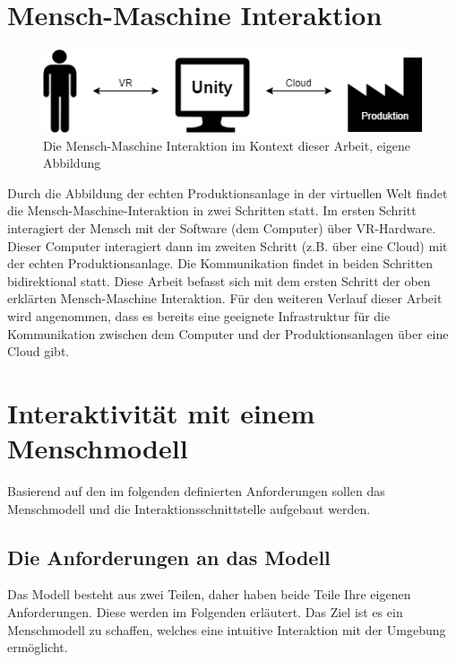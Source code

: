 \section{Mensch-Maschine Interaktion}\label{sec:MMInteraktion}
\begin{figure}[h]
	\centering
	\includegraphics[width=0.7\linewidth]{Bilder/A19_MMI}
	\caption{Die Mensch-Maschine Interaktion im Kontext dieser Arbeit, eigene Abbildung}
	\label{fig:MMI}
\end{figure}
\noindent Durch die Abbildung der echten Produktionsanlage in der virtuellen Welt findet die Mensch-Maschine-Interaktion in zwei Schritten statt. Im ersten Schritt interagiert der Mensch mit der Software (dem Computer) über VR-Hardware. Dieser Computer interagiert dann im zweiten Schritt (z.B. über eine Cloud) mit der echten Produktionsanlage. Die Kommunikation findet in beiden Schritten bidirektional statt.
\newline
Diese Arbeit befasst sich mit dem ersten Schritt der oben erklärten Mensch-Maschine Interaktion. Für den weiteren Verlauf dieser Arbeit wird angenommen, dass es bereits eine geeignete Infrastruktur für die Kommunikation zwischen dem Computer und der Produktionsanlagen über eine Cloud gibt.

\section{Interaktivität mit einem Menschmodell}\label{sec:ModellAufbau}
Basierend auf den im folgenden definierten Anforderungen sollen das Menschmodell und die Interaktionsschnittstelle aufgebaut werden.

\subsection{Die Anforderungen an das Modell}\label{sec:AnforderungenKonzept}
Das Modell besteht aus zwei Teilen, daher haben beide Teile Ihre eigenen Anforderungen. Diese werden im Folgenden erläutert. Das Ziel ist es ein Menschmodell zu schaffen, welches eine intuitive Interaktion mit der Umgebung ermöglicht.

